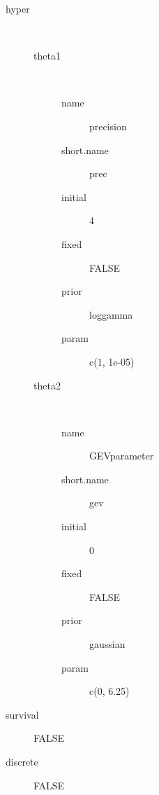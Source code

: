 \begin{description}
	\item[hyper]\ 
	 \begin{description}
	 	\item[theta1]\ 
	 	 \begin{description}
	 	 	 \item[ name ] precision 
	 	 	 \item[ short.name ] prec 
	 	 	 \item[ initial ] 4 
	 	 	 \item[ fixed ] FALSE 
	 	 	 \item[ prior ] loggamma 
	 	 	 \item[ param ] c(1, 1e-05) 
	 	 \end{description}
	 	\item[theta2]\ 
	 	 \begin{description}
	 	 	 \item[ name ] GEVparameter 
	 	 	 \item[ short.name ] gev 
	 	 	 \item[ initial ] 0 
	 	 	 \item[ fixed ] FALSE 
	 	 	 \item[ prior ] gaussian 
	 	 	 \item[ param ] c(0, 6.25) 
	 	 \end{description}
	 \end{description}
	 \item[ survival ] FALSE 
	 \item[ discrete ] FALSE 
\end{description}
